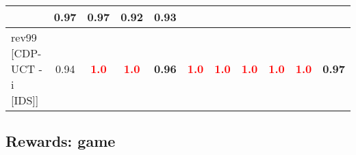 \documentclass{article}
\begin{document}
\begin{tabular}{|l|r@{$\pm$}rr@{$\pm$}rr@{$\pm$}rr@{$\pm$}rr@{$\pm$}rr@{$\pm$}rr@{$\pm$}rr@{$\pm$}rr@{$\pm$}rr@{$\pm$}r|}
& \multicolumn{2}{c}{0.97}
& \multicolumn{2}{c}{0.97}
& \multicolumn{2}{c}{0.92}
& \multicolumn{2}{c|}{0.93}
\\
\hline
rev99 [CDP-UCT -i [IDS]]
& \multicolumn{2}{c}{0.94}
& \multicolumn{2}{c}{\textbf{\textcolor{red}{1.0}}}
& \multicolumn{2}{c}{\textbf{\textcolor{red}{1.0}}}
& \multicolumn{2}{c}{\textbf{0.96}}
& \multicolumn{2}{c}{\textbf{\textcolor{red}{1.0}}}
& \multicolumn{2}{c}{\textbf{\textcolor{red}{1.0}}}
& \multicolumn{2}{c}{\textbf{\textcolor{red}{1.0}}}
& \multicolumn{2}{c}{\textbf{\textcolor{red}{1.0}}}
& \multicolumn{2}{c}{\textbf{\textcolor{red}{1.0}}}
& \multicolumn{2}{c|}{\textbf{0.97}}
\\
\hline
\end{tabular}%

\bigskip

\subsection*{Rewards: game}
\end{document}
